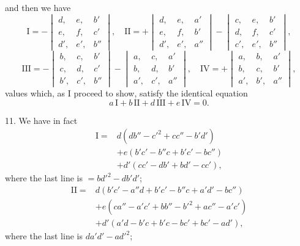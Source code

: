 \documentclass[11pt]{article}
\begin{document}
and then we have
\[
\mathrm{I} = -\begin{vmatrix} d, & e, & b'\\ e, & f, & c'\\ d', & e', & b'' \end{vmatrix},\quad
\mathrm{II} = +\begin{vmatrix} d, & e, & a'\\ e, & f, & b'\\ d', & e', & a'' \end{vmatrix} - \begin{vmatrix} c, & e, & b'\\ d, & f, & c'\\ c', & e', & b'' \end{vmatrix},
\]
\[
\mathrm{III} = -\begin{vmatrix} b, & c, & b'\\ c, & d, & c'\\ b', & c', & b'' \end{vmatrix} - \begin{vmatrix} a, & c, & a'\\ b, & d, & b'\\ a', & c', & a'' \end{vmatrix},\quad
\mathrm{IV} = +\begin{vmatrix} a, & b, & a'\\ b, & c, & b'\\ a', & b', & a'' \end{vmatrix},
\]
values which, as I proceed to show, satisfy the identical equation
\[
a\,\mathrm{I} + b\,\mathrm{II} + d\,\mathrm{III} + e\,\mathrm{IV} = 0.
\]

\medskip

11. We have in fact
\[
\begin{aligned}
\mathrm{I} = {}& d(db'' - c'^2 + cc'' - b'd')\\
& + e(b'c' - b''c + b'c' - bc'')\\
& + d'(cc' - db' + bd' - cc'),
\end{aligned}
\]
where the last line is $= bd'^2 - db'd'$;
\[
\begin{aligned}
\mathrm{II} = {}& d(b'c' - a''d + b'c' - b''c + a'd' - bc'')\\
& + e(ca'' - a'c' + bb'' - b'^2 + ac'' - a'c')\\
& + d'(a'd - b'c + b'c - bc' + bc' - ad'),
\end{aligned}
\]
where the last line is $da'd' - ad'^2$;

\newpage
\end{document}

